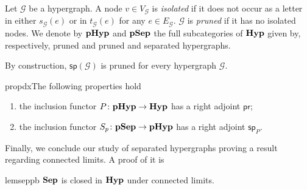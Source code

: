 \documentclass[3p]{elsarticle}
\newcommand{\catname}[1]{\textbf{\textup{#1}}}
\newcommand{\hyp}{\catname{Hyp}}
\newcommand{\phyp}{\catname{pHyp}}
\newcommand{\pshyp}{\catname{pSep}}
\newcommand{\shyp}{\catname{Sep}}
\renewcommand{\sp}{\mathsf{sp}}
\newcommand{\pr}{\mathsf{pr}}
\theoremstyle{remark}
\theoremstyle{definition}
\begin{document}
\begin{defi} Let $\mathcal{G}$ be a hypergraph. A node $v\in V_{\mathcal{G}}$ is \emph{isolated} if it does not occur as a letter in either $s_{\mathcal{G}}(e)$ or in
$t_{\mathcal{G}}(e)$ for any $e\in E_{\mathcal{G}}$. $\mathcal{G}$ is \emph{pruned} if it has no isolated nodes. We denote by $\phyp$ and $\pshyp$ the full subcategories of $\hyp$ given by, respectively, pruned and pruned and separated hypergraphs.
\end{defi}


\begin{rem}\label{rem:prun}
	By construction, $\sp(\mathcal{G})$ is pruned for every hypergraph $\mathcal{G}$.
\end{rem}


\begin{restatable}{prop}{dx}\label{prop:dx}The following properties hold
	\begin{enumerate}
		\item the inclusion functor $P\colon \phyp \to \hyp$ has a right adjoint $\pr$;
		\item the inclusion functor $S_p\colon \pshyp\to \phyp$ has a right adjoint $\sp_P$.
	\end{enumerate}
\end{restatable}

Finally, we conclude our study of separated hypergraphs proving a result regarding connected limits. A proof of it is 

\begin{restatable}{lem}{seppb}\label{lem:seplim}
	$\shyp$ is closed in $\hyp$ under connected limits.
\end{restatable}
\end{document}
